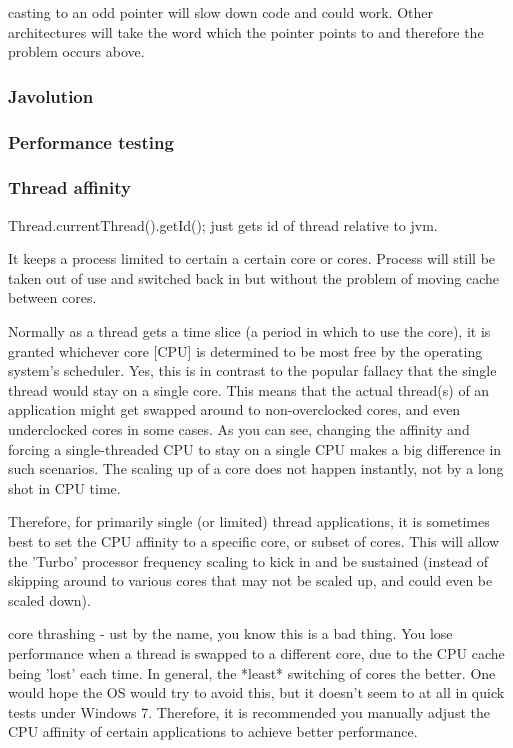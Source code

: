 \documentclass[final_report.tex]{subfiles}
\begin{document}
casting to an odd pointer will slow down code and could work. Other architectures will take the word which the pointer points to and therefore the problem occurs above.

\subsubsection{Javolution}
\subsubsection{Performance testing}

\subsubsection{Thread affinity}
Thread.currentThread().getId(); just gets id of thread relative to jvm.

It keeps a process limited to certain a certain core or cores. Process will still be taken out of use and switched back in but without the problem of moving cache between cores.

Normally as a thread gets a time slice (a period in which to use the core), it is granted whichever core [CPU] is determined to be most free by the operating system's scheduler. Yes, this is in contrast to the popular fallacy that the single thread would stay on a single core. This means that the actual thread(s) of an application might get swapped around to non-overclocked cores, and even underclocked cores in some cases. As you can see, changing the affinity and forcing a single-threaded CPU to stay on a single CPU makes a big difference in such scenarios. The scaling up of a core does not happen instantly, not by a long shot in CPU time.

Therefore, for primarily single (or limited) thread applications, it is sometimes best to set the CPU affinity to a specific core, or subset of cores. This will allow the 'Turbo' processor frequency scaling to kick in and be sustained (instead of skipping around to various cores that may not be scaled up, and could even be scaled down).

core thrashing - ust by the name, you know this is a bad thing. You lose performance when a thread is swapped to a different core, due to the CPU cache being 'lost' each time. In general, the *least* switching of cores the better. One would hope the OS would try to avoid this, but it doesn't seem to at all in quick tests under Windows 7. Therefore, it is recommended you manually adjust the CPU affinity of certain applications to achieve better performance.
\end{document}
